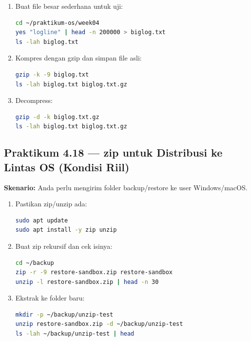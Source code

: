 \begin{enumerate}
    \item Buat file besar sederhana untuk uji:
\begin{lstlisting}[language=bash, caption={Membuat file uji besar}]
cd ~/praktikum-os/week04
yes "logline" | head -n 200000 > biglog.txt
ls -lah biglog.txt
\end{lstlisting}

    \item Kompres dengan gzip dan simpan file asli:
\begin{lstlisting}[language=bash, caption={gzip dengan keep}]
gzip -k -9 biglog.txt
ls -lah biglog.txt biglog.txt.gz
\end{lstlisting}

    \item Decompress:
\begin{lstlisting}[language=bash, caption={Decompress gzip}]
gzip -d -k biglog.txt.gz
ls -lah biglog.txt biglog.txt.gz
\end{lstlisting}
\end{enumerate}

\subsection*{Praktikum 4.18 --- zip untuk Distribusi ke Lintas OS (Kondisi Riil)}
\textbf{Skenario:} Anda perlu mengirim folder backup/restore ke user Windows/macOS.

\begin{enumerate}
    \item Pastikan zip/unzip ada:
\begin{lstlisting}[language=bash, caption={Install zip/unzip}]
sudo apt update
sudo apt install -y zip unzip
\end{lstlisting}

    \item Buat zip rekursif dan cek isinya:
\begin{lstlisting}[language=bash, caption={Membuat zip dan melihat isi tanpa ekstrak}]
cd ~/backup
zip -r -9 restore-sandbox.zip restore-sandbox
unzip -l restore-sandbox.zip | head -n 30
\end{lstlisting}

    \item Ekstrak ke folder baru:
\begin{lstlisting}[language=bash, caption={Ekstrak zip ke folder tujuan}]
mkdir -p ~/backup/unzip-test
unzip restore-sandbox.zip -d ~/backup/unzip-test
ls -lah ~/backup/unzip-test | head
\end{lstlisting}
\end{enumerate}

